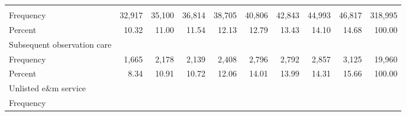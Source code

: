 \documentclass{article}
\begin{document}
\begin{table}[!h]
\begin{tabular}{llllllllll}
  \multicolumn{1}{|r}{} &
  \multicolumn{1}{r}{} &
  \multicolumn{1}{r}{} &
  \multicolumn{1}{r}{} &
  \multicolumn{1}{r}{} &
  \multicolumn{1}{r}{} &
  \multicolumn{1}{r}{} &
  \multicolumn{1}{r}{} &
  \multicolumn{1}{r}{} \\
\multicolumn{1}{l}{\hspace{2em}Frequency} &
  \multicolumn{1}{|r}{32,917} &
  \multicolumn{1}{r}{35,100} &
  \multicolumn{1}{r}{36,814} &
  \multicolumn{1}{r}{38,705} &
  \multicolumn{1}{r}{40,806} &
  \multicolumn{1}{r}{42,843} &
  \multicolumn{1}{r}{44,993} &
  \multicolumn{1}{r}{46,817} &
  \multicolumn{1}{r}{318,995} \\
\multicolumn{1}{l}{\hspace{2em}Percent} &
  \multicolumn{1}{|r}{10.32} &
  \multicolumn{1}{r}{11.00} &
  \multicolumn{1}{r}{11.54} &
  \multicolumn{1}{r}{12.13} &
  \multicolumn{1}{r}{12.79} &
  \multicolumn{1}{r}{13.43} &
  \multicolumn{1}{r}{14.10} &
  \multicolumn{1}{r}{14.68} &
  \multicolumn{1}{r}{100.00} \\
\multicolumn{1}{l}{\hspace{1em}Subsequent observation care} &
  \multicolumn{1}{|r}{} &
  \multicolumn{1}{r}{} &
  \multicolumn{1}{r}{} &
  \multicolumn{1}{r}{} &
  \multicolumn{1}{r}{} &
  \multicolumn{1}{r}{} &
  \multicolumn{1}{r}{} &
  \multicolumn{1}{r}{} &
  \multicolumn{1}{r}{} \\
\multicolumn{1}{l}{\hspace{2em}Frequency} &
  \multicolumn{1}{|r}{1,665} &
  \multicolumn{1}{r}{2,178} &
  \multicolumn{1}{r}{2,139} &
  \multicolumn{1}{r}{2,408} &
  \multicolumn{1}{r}{2,796} &
  \multicolumn{1}{r}{2,792} &
  \multicolumn{1}{r}{2,857} &
  \multicolumn{1}{r}{3,125} &
  \multicolumn{1}{r}{19,960} \\
\multicolumn{1}{l}{\hspace{2em}Percent} &
  \multicolumn{1}{|r}{8.34} &
  \multicolumn{1}{r}{10.91} &
  \multicolumn{1}{r}{10.72} &
  \multicolumn{1}{r}{12.06} &
  \multicolumn{1}{r}{14.01} &
  \multicolumn{1}{r}{13.99} &
  \multicolumn{1}{r}{14.31} &
  \multicolumn{1}{r}{15.66} &
  \multicolumn{1}{r}{100.00} \\
\multicolumn{1}{l}{\hspace{1em}Unlisted e\&m service} &
  \multicolumn{1}{|r}{} &
  \multicolumn{1}{r}{} &
  \multicolumn{1}{r}{} &
  \multicolumn{1}{r}{} &
  \multicolumn{1}{r}{} &
  \multicolumn{1}{r}{} &
  \multicolumn{1}{r}{} &
  \multicolumn{1}{r}{} &
  \multicolumn{1}{r}{} \\
\multicolumn{1}{l}{\hspace{2em}Frequency} &

\end{tabular}
\end{table}
\end{document}
